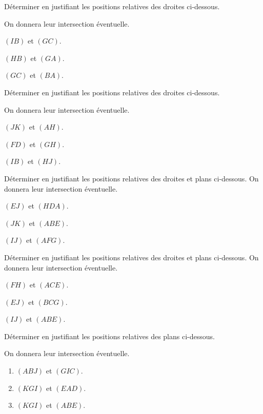 \documentclass{cornouaille}
\begin{document}
\begin{exercice}
  Déterminer en justifiant les positions relatives des droites
  ci-dessous. 

  On donnera leur intersection éventuelle.
  \begin{colenumerate}{2}
  \item $(IB)$ et $(GC)$.
  \item $(HB)$ et $(GA)$.
  \item $(GC)$ et $(BA)$.
  \end{colenumerate}
\end{exercice}

\begin{exercice}
  Déterminer en justifiant les positions relatives des droites
  ci-dessous. 

  On donnera leur intersection éventuelle.
  \begin{colenumerate}{2}
  \item $(JK)$ et $(AH)$.
  \item $(FD)$ et $(GH)$.
  \item $(IB)$ et $(HJ)$.
  \end{colenumerate}
\end{exercice}

\begin{exercice}
  Déterminer en justifiant les positions relatives des droites et
  plans ci-dessous. On donnera leur intersection éventuelle.
  \begin{colenumerate}{2}
  \item $(EJ)$ et $(HDA)$.
  \item $(JK)$ et $(ABE)$.
  \item $(IJ)$ et $(AFG)$.
  \end{colenumerate}
\end{exercice}

\begin{exercice}
  Déterminer en justifiant les positions relatives des droites et
  plans ci-dessous. On donnera leur intersection éventuelle.
  \begin{colenumerate}{2}
  \item $(FH)$ et $(ACE)$.
  \item $(EJ)$ et $(BCG)$.
  \item $(IJ)$ et $(ABE)$.
  \end{colenumerate}
\end{exercice}



\begin{exercice}
  Déterminer en justifiant les positions relatives des plans
  ci-dessous. 

  On donnera leur intersection éventuelle.
  \begin{enumerate}
  \item $(ABJ)$ et $(GIC)$.
  \item $(KGI)$ et $(EAD)$.
  \item $(KGI)$ et $(ABE)$.
  \end{enumerate}
\end{exercice}
\end{document}
